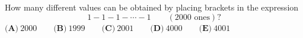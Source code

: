 How many different values can be obtained by placing brackets in the expression
\[
1-1-1-\cdots-1\qquad(2000\text{ ones})?
\]
$\textbf{(A)}\ 2000\qquad\textbf{(B)}\ 1999\qquad\textbf{(C)}\ 2001\qquad\textbf{(D)}\ 4000\qquad\textbf{(E)}\ 4001$
